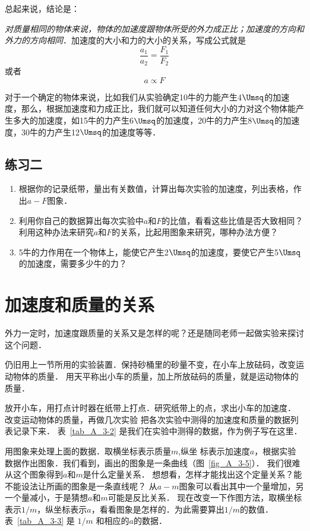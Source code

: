 总起来说，结论是：

\textit{对质量相同的物体来说，物体的加速度跟物体所受的外力成正比；加速度的方向和外力的方向相同}．加速度的大小和力的大小的关系，写成公式就是
\[\frac{a_1}{a_2}=\frac{F_1}{F_2} \]
或者
\[a\propto F\]

对于一个确定的物体来说，比如我们从实验确定10牛的力能产生4$\Umsq$的加速度，那么，根据加速度和力成正比，我们就可以知道任何大小的力对这个物体能产生多大的加速度，如15牛的力产生6$\Umsq$的加速度，20牛的力产生8$\Umsq$的加速度，30牛的力产生12$\Umsq$的加速度等等．

\subsection*{练习二}
\begin{enumerate}
	\item 根据你的记录纸带，量出有关数值，计算出每次实验的加速度，列出表格，作出$a-F$图象．
	\item 利用你自己的数据算出每次实验中$a$和$F$的比值，看看这些比值是否大致相同？利用这种办法来研究$a$和$F$的关系，比起用图象来研究，哪种办法方便？
	\item 5牛的力作用在一个物体上，能使它产生2$\Umsq$的加速度，要使它产生5$\Umsq$的加速度，需要多少牛的力？
\end{enumerate}


\section{加速度和质量的关系}\label{sec-A-3-relationship-between-acceleration-and-mass}
外力一定时，加速度跟质量的关系又是怎样的呢？还是随同老师一起做实验来探讨这个问题．

仍旧用上一节所用的实验装置．保持砂桶里的砂量不变，在小车上放砝码，改变运动物体的质量．
用天平称出小车的质量，加上所放砝码的质量，就是运动物体的质量．

放开小车，用打点计时器在纸带上打点．研究纸带上的点，求出小车的加速度．
改变运动物体的质量，再做几次实验
把各次实验中测得的加速度和质量的数据列表记录下来．
表~\ref{tab_A_3-2} 是我们在实验中测得的数据，作为例子写在这里．

用图象来处理上面的数据．取横坐标表示质量$m$,纵坐
标表示加速度$a$，根据实验数据作出图象．我们看到，画出的图象是一条曲线（图~\ref{fig_A_3-5}）．
我们很难从这个图象得到$a$和$m$是什么定量关系．
想想看，怎样才能找出这个定量关系？能不能设法让所画的图象是一条直线呢？
从$a-m$图象可以看出其中一个量增加，另一个量减小，于是猜想$a$和$m$可能是反比关系．
现在改变一下作图方法，取横坐标表示$1/m$，纵坐标表示$a$，看看图象是怎样的．为此需要算出$1/m$的数值．
表~\ref{tab_A_3-3} 是 $1/m$ 和相应的$a$的数据．

